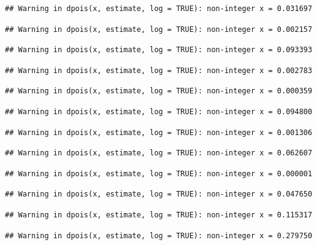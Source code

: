 \documentclass[]{article}
\begin{document}
\begin{verbatim}
## Warning in dpois(x, estimate, log = TRUE): non-integer x = 0.031697
\end{verbatim}

\begin{verbatim}
## Warning in dpois(x, estimate, log = TRUE): non-integer x = 0.002157
\end{verbatim}

\begin{verbatim}
## Warning in dpois(x, estimate, log = TRUE): non-integer x = 0.093393
\end{verbatim}

\begin{verbatim}
## Warning in dpois(x, estimate, log = TRUE): non-integer x = 0.002783
\end{verbatim}

\begin{verbatim}
## Warning in dpois(x, estimate, log = TRUE): non-integer x = 0.000359
\end{verbatim}

\begin{verbatim}
## Warning in dpois(x, estimate, log = TRUE): non-integer x = 0.094800
\end{verbatim}

\begin{verbatim}
## Warning in dpois(x, estimate, log = TRUE): non-integer x = 0.001306
\end{verbatim}

\begin{verbatim}
## Warning in dpois(x, estimate, log = TRUE): non-integer x = 0.062607
\end{verbatim}

\begin{verbatim}
## Warning in dpois(x, estimate, log = TRUE): non-integer x = 0.000001
\end{verbatim}

\begin{verbatim}
## Warning in dpois(x, estimate, log = TRUE): non-integer x = 0.047650
\end{verbatim}

\begin{verbatim}
## Warning in dpois(x, estimate, log = TRUE): non-integer x = 0.115317
\end{verbatim}

\begin{verbatim}
## Warning in dpois(x, estimate, log = TRUE): non-integer x = 0.279750
\end{verbatim}
\end{document}

